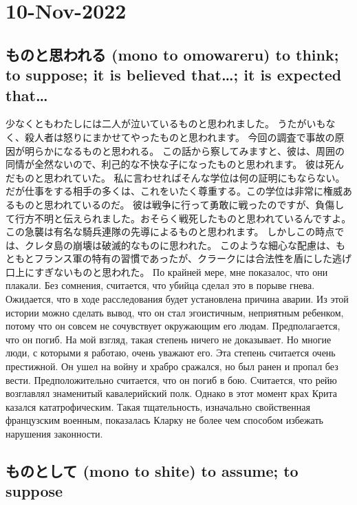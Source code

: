 \section{10-Nov-2022}
\subsection{ものと思われる (mono to omowareru) to think; to suppose; it is believed that…; it is expected that… }

少なくともわたしには二人が泣いているものと思われました。
うたがいもなく、殺人者は怒りにまかせてやったものと思われます。
今回の調査で事故の原因が明らかになるものと思われる。
この話から察してみますと、彼は、周囲の同情が全然ないので、利己的な不快な子になったものと思われます。
彼は死んだものと思われていた。
私に言わせればそんな学位は何の証明にもならない。だが仕事をする相手の多くは、これをいたく尊重する。この学位は非常に権威あるものと思われているのだ。
彼は戦争に行って勇敢に戦ったのですが、負傷して行方不明と伝えられました。おそらく戦死したものと思われているんですよ。
この急襲は有名な騎兵連隊の先導によるものと思われます。
しかしこの時点では、クレタ島の崩壊は破滅的なものに思われた。
このような細心な配慮は、もともとフランス軍の特有の習慣であったが、クラークには合法性を盾にした逃げ口上にすぎないものと思われた。
По крайней мере, мне показалос, что они плакали.
Без сомнения, считается, что убийца сделал это в порыве гнева.
Ожидается, что в ходе расследования будет установлена причина аварии.
Из этой истории можно сделать вывод, что он стал эгоистичным, неприятным ребенком, потому что он совсем не сочувствует окружающим его людам.
Предполагается, что он погиб.
На мой взгляд, такая степень ничего не доказывает. Но многие люди, с которыми я работаю, очень уважают его. Эта степень считается очень престижной.
Он ушел на войну и храбро сражался, но был ранен и пропал без вести. Предположительно считается, что он погиб в бою.
Считается, что рейю возглавлял знаменитый кавалерийский полк.
Однако в этот момент крах Крита казался кататрофическим.
Такая тщательность, изначально свойственная французским военным, показалась Кларку не более чем способом избежать нарушения законности.

\subsection{ものとして (mono to shite) to assume; to suppose}

